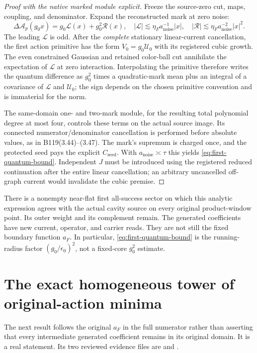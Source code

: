 \begin{proof}[Proof with the native marked module explicit]
Freeze the source-zero cut, maps, coupling, and denominator. Expand the reconstructed mark at zero noise:
\[
 \Delta\mathcal A_p(g_0x)=g_0\mathcal L(x)+g_0^2\mathcal R(x),
 \quad |\mathcal L|\lesssim\eta_Fa_{\mathrm{noise}}^{-1}|x|,
 \quad |\mathcal R|\lesssim\eta_Fa_{\mathrm{noise}}^{-2}|x|^2.
\]
The leading $\mathcal L$ is odd. After the \emph{complete} stationary linear-current cancellation, the first action primitive has the form $V_0=g_0\mathcal U_0$ with its registered cubic growth. The even constrained Gaussian and retained color-ball cut annihilate the expectation of $\mathcal L$ at zero interaction. Interpolating the primitive therefore writes the quantum difference as $g_0^2$ times a quadratic-mark mean plus an integral of a covariance of $\mathcal L$ and $\mathcal U_0$; the sign depends on the chosen primitive convention and is immaterial for the norm.

The same-domain one- and two-mark module, for the resulting total polynomial degree at most four, controls these terms on the actual source image. Its connected numerator/denominator cancellation is performed before absolute values, as in B119(3.44)--(3.47). The mark's supremum is charged once, and the protected seed pays the explicit $C_{\mathrm{seed}}$. With $a_{\mathrm{noise}}\asymp\tau$ this yields \eqref{eq:first-quantum-bound}. Independent $J$ must be introduced using the registered reduced continuation after the entire linear cancellation; an arbitrary uncancelled off-graph current would invalidate the cubic premise.
\end{proof}

There is a nonempty near-flat first all-success sector on which this analytic expression agrees with the actual cavity source on every original product-window point. Its outer weight and its complement remain. The generated coefficients have new current, operator, and carrier reads. They are not still the fixed boundary function $a_F$. In particular, \eqref{eq:first-quantum-bound} is the running-radius factor $(g_0/\epsilon_0)^2$, not a fixed-core $g_0^2$ estimate.

\section{The exact homogeneous tower of original-action minima}
\label{sec:tower}

The next result follows the original $a_F$ in the full numerator rather than asserting that every intermediate generated coefficient remains in its original domain. It is a real statement. Its two reviewed evidence files are  and .

